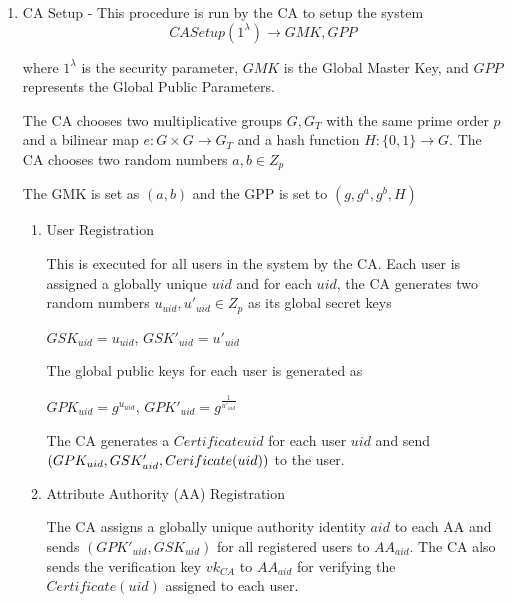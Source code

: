 \begin{enumerate}
	
	\item CA Setup - This procedure is run by the CA to setup the system $$ CASetup(1^{\lambda}) \longrightarrow GMK, GPP $$
	
	where $ 1^{\lambda} $ is the security parameter, $ GMK $ is the Global Master Key, and $ GPP $ represents the Global Public Parameters.
	
	The CA chooses two multiplicative groups $ G, G_{T} $ with the same prime order $ p $ and a bilinear map $ e \colon G \times G \rightarrow G_{T} $ and a hash function $ H \colon \{0, 1\} \rightarrow G. $ The CA chooses two random numbers $ a, b \in Z_{p} $
	
	The GMK is set as $ (a, b) $ and the GPP is set to $ (g, g^{a}, g^{b}, H) $
	
	\begin{enumerate}
		
		\item User Registration
		
		This is executed for all users in the system by the CA. Each user is assigned a globally unique $ uid $ and for each $ uid $, the CA generates two random numbers $ u_{uid}, u'_{uid} \in Z_{p} $ as its global secret keys
		
		\begin{center}
			$ GSK_{uid} = u_{uid} $, $ GSK'_{uid} = u'_{uid} $
		\end{center}
		
		The global public keys for each user is generated as 
		
		\begin{center}
			$ GPK_{uid} = g^{u_{uid}} $, $ GPK'_{uid} = g^{\frac{1}{u'_{uid}}} $
		\end{center}
		
		The CA generates a $ Certificate{uid} $ for each user $ uid $ and send $ (GPK_{uid}, GSK'_{uid}, \\ Cerificate(uid)) $ to the user.
		
		\item Attribute Authority (AA) Registration
		
		The CA assigns a globally unique authority identity $ aid $ to each AA and sends $ (GPK'_{uid}, GSK_{uid}) $ for all registered users to $ AA_{aid} $. The CA also sends the verification key $ vk_{CA} $ to $ AA_{aid} $ for verifying the $ Certificate(uid) $ assigned to each user.
		
	\end{enumerate}
	

\end{enumerate}
